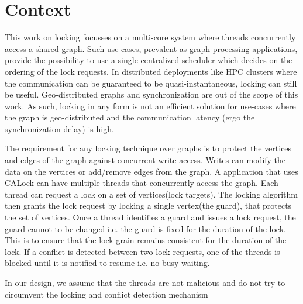 
\section{Context}
This work on locking focusses on a multi-core system where threads concurrently access a shared graph. Such use-cases, prevalent as graph processing applications, provide the possibility to use a single centralized scheduler which decides on the ordering of the lock requests. In distributed deployments like HPC clusters where the communication can be guaranteed to be quasi-instantaneous, locking can still be useful. Geo-distributed graphs and synchronization are out of the scope of this work. As such, locking in any form is not an efficient solution for use-cases where the graph is geo-distributed and the communication latency (ergo the synchronization delay) is high. 

The requirement for any locking technique over graphs is to protect the vertices and edges of the graph against concurrent write access. Writes can modify the data on the vertices or add/remove edges from the graph. A application that uses CALock can have multiple threads that concurrently access the graph. Each thread can request a lock on a set of vertices(lock targets). The locking algorithm then grants the lock request by locking a single vertex(the guard), that protects the set of vertices.
Once a thread identifies a guard and issues a lock request, the guard cannot to be changed i.e. the guard is fixed for the duration of the lock. This is to ensure that the lock grain remains consistent for the duration of the lock. If a conflict is detected between two lock requests, one of the threads is blocked until it is notified to resume i.e. no busy waiting. 

In our design, we assume that the threads are not malicious and do not try to circumvent the locking and conflict detection mechanism
